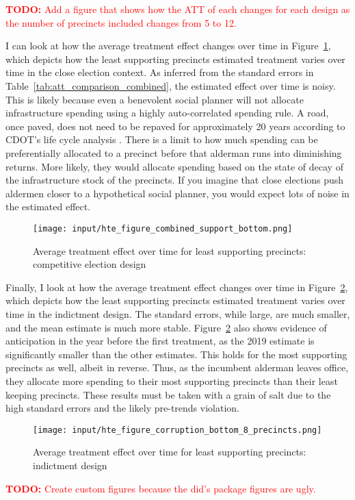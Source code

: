 \textcolor{red}{\textbf{TODO:} Add a figure that shows how the ATT of each changes for each design as the number of precincts included changes from 5 to 12.}

I can look at how the average treatment effect changes over time in Figure~\ref{fig:att_comparison_close_election_bottom}, which depicts how the least supporting precincts estimated treatment varies over time in the close election context.
As inferred from the standard errors in Table~\ref{tab:att_comparison_combined}, the estimated effect over time is noisy.
This is likely because even a benevolent social planner will not allocate infrastructure spending using a highly auto-correlated spending rule.
A road, once paved, does not need to be repaved for approximately 20 years according to CDOT's life cycle analysis \citep{OIGaudit}.
There is a limit to how much spending can be preferentially allocated to a precinct before that alderman runs into diminishing returns.
More likely, they would allocate spending based on the state of decay of the infrastructure stock of the precincts.
If you imagine that close elections push aldermen closer to a hypothetical social planner, you would expect lots of noise in the estimated effect.

\begin{figure}[ht]
    \centering
    \texttt{[image: input/hte\_figure\_combined\_support\_bottom.png]}
    \caption{Average treatment effect over time for least supporting precincts: competitive election design}
    \label{fig:att_comparison_close_election_bottom}
\end{figure}


Finally, I look at how the average treatment effect changes over time in Figure~\ref{fig:att_comparison_corruption_bottom}, which depicts how the least supporting precincts estimated treatment varies over time in the indictment design.
The standard errors, while large, are much smaller, and the mean estimate is much more stable.
Figure~\ref{fig:att_comparison_corruption_bottom} also shows evidence of anticipation in the year before the first treatment, as the 2019 estimate is significantly smaller than the other estimates.
This holds for the most supporting precincts as well, albeit in reverse.
Thus, as the incumbent alderman leaves office, they allocate more spending to their most supporting precincts than their least keeping precincts.
These results must be taken with a grain of salt due to the high standard errors and the likely pre-trends violation.

\begin{figure}[H]
    \centering
    \texttt{[image: input/hte\_figure\_corruption\_bottom\_8\_precincts.png]}
    \caption{Average treatment effect over time for least supporting precincts: indictment design}
    \label{fig:att_comparison_corruption_bottom}
\end{figure}

\textcolor{red}{\textbf{TODO:} Create custom figures because the did's package figures are ugly.}
